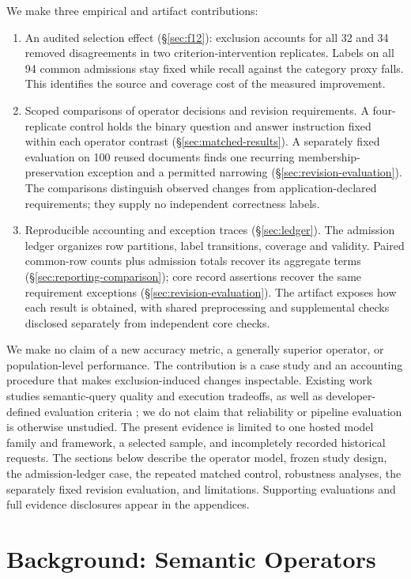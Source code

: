 \documentclass[11pt]{article}
\begin{document}
We make three empirical and artifact contributions:
\begin{enumerate}[leftmargin=1.5em]
\item An audited selection effect (\S\ref{sec:f12}): exclusion accounts for
all 32 and 34 removed disagreements in two criterion-intervention replicates.
Labels on all 94 common admissions stay fixed while recall against the
category proxy falls. This identifies the source and coverage cost of the
measured improvement.
\item Scoped comparisons of operator decisions and revision requirements.
A four-replicate control holds the binary question and answer instruction
fixed within each operator contrast (\S\ref{sec:matched-results}). A
separately fixed evaluation on 100 reused documents finds one recurring
membership-preservation exception and a permitted narrowing
(\S\ref{sec:revision-evaluation}). The comparisons distinguish observed
changes from application-declared requirements; they supply no independent
correctness labels.
\item Reproducible accounting and exception traces (\S\ref{sec:ledger}).
The admission ledger organizes row partitions, label transitions, coverage
and validity. Paired common-row counts plus admission totals recover its
aggregate terms (\S\ref{sec:reporting-comparison}); core record assertions
recover the same requirement exceptions (\S\ref{sec:revision-evaluation}).
The artifact exposes how each result is obtained, with shared preprocessing
and supplemental checks disclosed separately from independent core checks.
\end{enumerate}
We make no claim of a new accuracy metric, a generally superior operator, or
population-level performance. The contribution is a case study and an
accounting procedure that makes exclusion-induced changes inspectable.
Existing work studies semantic-query quality and execution
tradeoffs, as well as developer-defined evaluation criteria
\cite{sembench,promptevals,evalgen}; we do not claim that reliability or
pipeline evaluation is otherwise unstudied. The present evidence is limited
to one hosted model family and framework, a selected sample, and incompletely
recorded historical requests. The sections below describe the operator model, frozen study design,
the admission-ledger case, the repeated matched control, robustness analyses,
the separately fixed revision evaluation, and limitations. Supporting
evaluations and full evidence disclosures appear
in the appendices.


\section{Background: Semantic Operators}
\label{sec:background}
\end{document}
